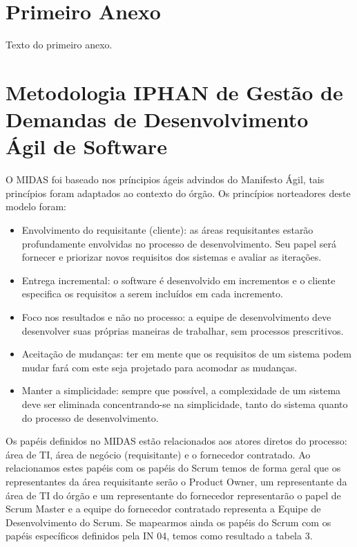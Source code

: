 \begin{anexosenv}

\partanexos

\chapter{Primeiro Anexo}

Texto do primeiro anexo.

\chapter{Metodologia IPHAN de Gestão de Demandas de Desenvolvimento Ágil de Software}

O MIDAS foi baseado nos príncipios ágeis advindos do Manifesto Ágil, tais princípios foram adaptados ao contexto do órgão. Os princípios norteadores deste modelo foram:
\begin{itemize}
\item Envolvimento do requisitante (cliente): as áreas requisitantes estarão profundamente envolvidas no processo de desenvolvimento. Seu papel será fornecer e priorizar novos requisitos dos sistemas e avaliar as iterações.
\item Entrega incremental: o software é desenvolvido em incrementos e o cliente especifica os requisitos a serem incluídos em cada incremento.
\item Foco nos resultados e não no processo: a equipe de desenvolvimento deve desenvolver suas próprias maneiras de trabalhar, sem processos prescritivos.
\item Aceitação de mudanças: ter em mente que os requisitos de um sistema podem mudar fará com este seja projetado para acomodar as mudanças.
\item Manter a simplicidade: sempre que possível, a complexidade de um sistema deve ser eliminada concentrando-se na simplicidade, tanto do sistema quanto do processo de desenvolvimento.
\end{itemize}

Os papéis definidos no MIDAS estão relacionados aos atores diretos do processo: área de TI, área de negócio (requisitante) e o fornecedor contratado. Ao relacionamos estes papéis com os papéis do Scrum temos de forma geral que os representantes da área requisitante serão o Product Owner, um representante da área de TI do órgão e um representante do fornecedor representarão o papel de Scrum Master e a equipe do fornecedor contratado representa a Equipe de Desenvolvimento do Scrum. Se mapearmos ainda os papéis do Scrum com os papéis específicos definidos pela IN 04, temos como resultado a tabela 3. 


\end{anexosenv}
